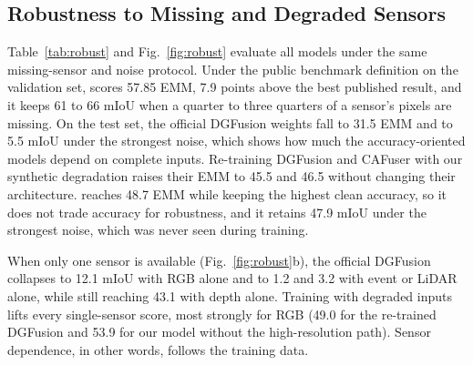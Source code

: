\subsection{Robustness to Missing and Degraded Sensors}
Table~\ref{tab:robust} and Fig.~\ref{fig:robust} evaluate all models under the same missing-sensor and noise protocol. Under the public benchmark definition on the validation set, \ours{} scores 57.85 EMM, 7.9 points above the best published result, and it keeps 61 to 66 mIoU when a quarter to three quarters of a sensor's pixels are missing. On the test set, the official DGFusion weights fall to 31.5 EMM and to 5.5 mIoU under the strongest noise, which shows how much the accuracy-oriented models depend on complete inputs. Re-training DGFusion and CAFuser with our synthetic degradation raises their EMM to 45.5 and 46.5 without changing their architecture. \ours{} reaches 48.7 EMM while keeping the highest clean accuracy, so it does not trade accuracy for robustness, and it retains 47.9 mIoU under the strongest noise, which was never seen during training.

When only one sensor is available (Fig.~\ref{fig:robust}b), the official DGFusion collapses to 12.1 mIoU with RGB alone and to 1.2 and 3.2 with event or LiDAR alone, while still reaching 43.1 with depth alone. Training with degraded inputs lifts every single-sensor score, most strongly for RGB (49.0 for the re-trained DGFusion and 53.9 for our model without the high-resolution path). Sensor dependence, in other words, follows the training data.

